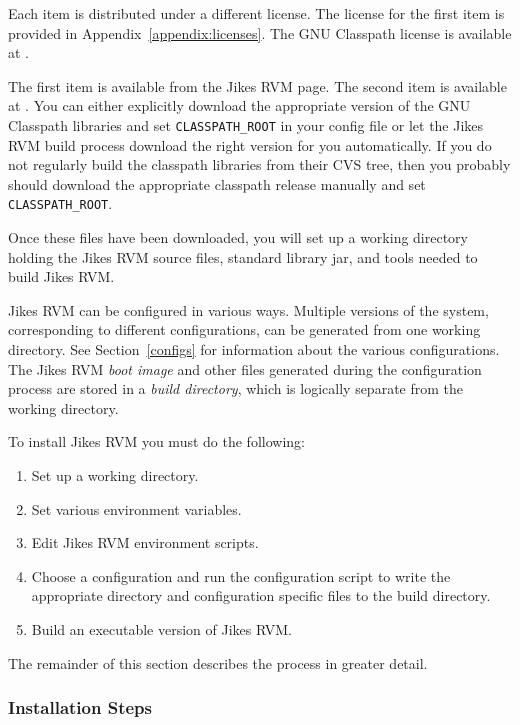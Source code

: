 Each item is distributed under a different license.  The license for
the first item is provided in Appendix~\ref{appendix:licenses}.  The
GNU Classpath license is available at \xlink{{\tt
\classpathURL}}{\classpathURL}. 

The first item is available  from the Jikes RVM
 page. The second item is available at
\xlink{{\tt \classpathURL}}{\classpathURL}.
You can either explicitly download the appropriate version of the GNU
Classpath libraries and set {\tt CLASSPATH\_ROOT} in your config file or let
the Jikes RVM build process download the right version for you
automatically. If you do not regularly build the classpath libraries
from their CVS tree, then you probably should download the appropriate
classpath release manually and set {\tt CLASSPATH\_ROOT}. 

Once these files have been downloaded, you will set up 
a working directory holding the Jikes RVM source files, standard
library jar, and tools needed to build Jikes RVM. 

Jikes RVM can be configured in various ways. Multiple versions of the system,
corresponding to different configurations, can be generated from 
one working directory. See Section~\ref{configs} for information about the 
various 
configurations.
The Jikes RVM  {\em boot image} and other files generated during the 
configuration process
are stored in a {\em build directory}, which is logically separate from 
the working directory. 

To install Jikes RVM  you must do the following:
\begin{enumerate}
\item Set up a working directory.
\item Set various environment variables.
\item Edit Jikes RVM environment scripts.
\item Choose a configuration and run the configuration script to write
the appropriate directory and configuration specific files to the
build directory.
\item Build an executable version of Jikes RVM.
\end{enumerate}

The remainder of this section describes the process in greater detail.

\JikesTMFooter

\subsubsection{Installation Steps}

